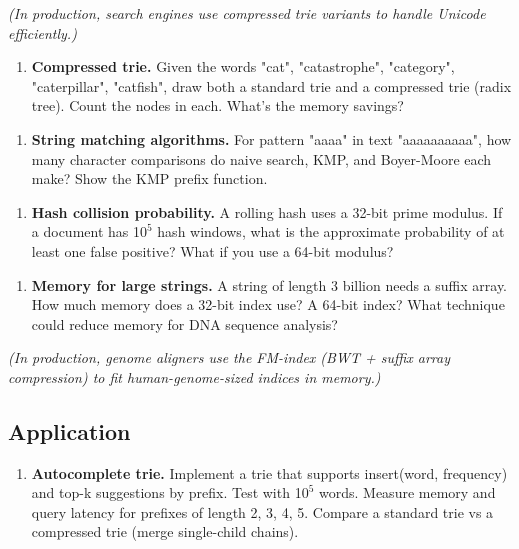    \textit{(In production, search engines use compressed trie variants to handle Unicode efficiently.)}

\begin{enumerate}
\item \textbf{Compressed trie.} Given the words "cat", "catastrophe", "category", "caterpillar", "catfish", draw both a standard trie and a compressed trie (radix tree). Count the nodes in each. What's the memory savings?
\end{enumerate}

\begin{enumerate}
\item \textbf{String matching algorithms.} For pattern "aaaa" in text "aaaaaaaaaa", how many character comparisons do naive search, KMP, and Boyer-Moore each make? Show the KMP prefix function.
\end{enumerate}

\begin{enumerate}
\item \textbf{Hash collision probability.} A rolling hash uses a 32-bit prime modulus. If a document has 1$0^{5}$ hash windows, what is the approximate probability of at least one false positive? What if you use a 64-bit modulus?
\end{enumerate}

\begin{enumerate}
\item \textbf{Memory for large strings.} A string of length 3 billion needs a suffix array. How much memory does a 32-bit index use? A 64-bit index? What technique could reduce memory for DNA sequence analysis?
\end{enumerate}

   \textit{(In production, genome aligners use the FM-index (BWT + suffix array compression) to fit human-genome-sized indices in memory.)}

\subsection{Application}

\begin{enumerate}
\item \textbf{Autocomplete trie.} Implement a trie that supports insert(word, frequency) and top-k suggestions by prefix. Test with 1$0^{5}$ words. Measure memory and query latency for prefixes of length 2, 3, 4, 5. Compare a standard trie vs a compressed trie (merge single-child chains).
\end{enumerate}

